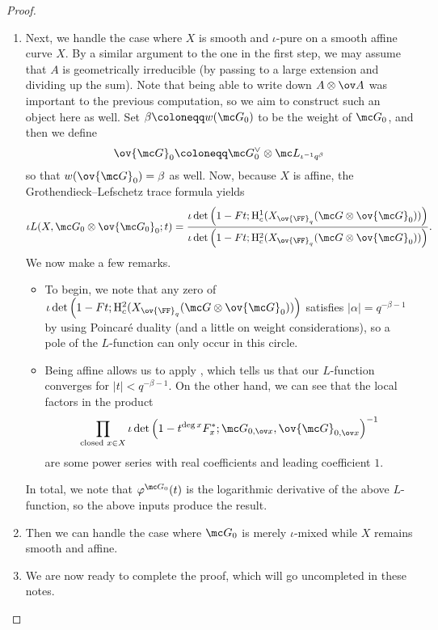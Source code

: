 \documentclass[../notes.tex]{subfiles}
\begin{document}
\begin{proof}
\begin{enumerate}
		\item Next, we handle the case where $X$ is smooth and $\iota$-pure on a smooth affine curve $X$. By a similar argument to the one in the first step, we may assume that $A$ is geometrically irreducible (by passing to a large extension and dividing up the sum). Note that being able to write down $A\otimes\ov A$ was important to the previous computation, so we aim to construct such an object here as well. Set $\beta\coloneqq w(\mc G_0)$ to be the weight of $\mc G_0$, and then we define
		\[\ov{\mc G}_0\coloneqq\mc G_0^\lor\otimes\mc L_{\iota^{-1}q^\beta}\]
		so that $w(\ov{\mc G}_0)=\beta$ as well. Now, because $X$ is affine, the Grothendieck--Lefschetz trace formula yields
		\[\iota L(X,\mc G_0\otimes\ov{\mc G_0}_0;t)=\frac{\iota\det\left(1-Ft;\mathrm H^1_c(X_{\ov{\FF}_q}(\mc G\otimes\ov{\mc G}_0))\right)}{\iota\det\left(1-Ft;\mathrm H^2_c(X_{\ov{\FF}_q}(\mc G\otimes\ov{\mc G}_0))\right)}.\]
		We now make a few remarks.
		\begin{itemize}
			\item To begin, we note that any zero of $\iota\det\left(1-Ft;\mathrm H^2_c(X_{\ov{\FF}_q}(\mc G\otimes\ov{\mc G}_0))\right)$ satisfies $\left|\alpha\right|=q^{-\beta-1}$ by using Poincar\'e duality (and a little on weight considerations), so a pole of the $L$-function can only occur in this circle.
			\item Being affine allows us to apply , which tells us that our $L$-function converges for $\left|t\right|<q^{-\beta-1}$. On the other hand, we can see that the local factors in the product
			\[\prod_{\text{closed }x\in X}\iota\det\left(1-t^{\deg x}F_x^*;\mc G_{0,\ov x},\ov{\mc G}_{0,\ov x}\right)^{-1}\]
			are some power series with real coefficients and leading coefficient $1$.
		\end{itemize}
		In total, we note that $\varphi^{\mc G_0}(t)$ is the logarithmic derivative of the above $L$-function, so the above inputs produce the result.

		\item Then we can handle the case where $\mc G_0$ is merely $\iota$-mixed while $X$ remains smooth and affine.

		\item We are now ready to complete the proof, which will go uncompleted in these notes.
		\qedhere
	\end{enumerate}
\end{proof}
\end{document}
